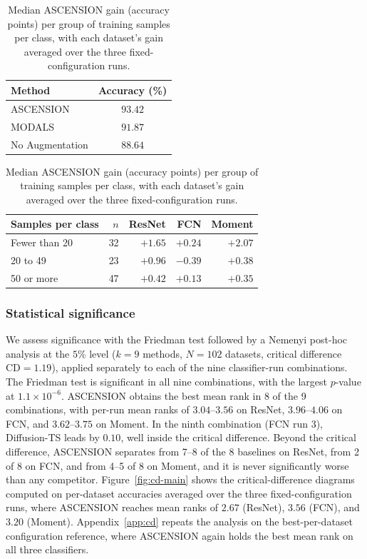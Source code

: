 \begin{table}[t]
\centering
\small
\begin{minipage}[t]{0.40\textwidth}
\centering
\caption{ASCENSION and MODALS performance on HAR dataset from
\citep{cheung2020modals}.}
\label{tab:modals}
\begin{tabular}{@{}lc@{}}
\toprule
\textbf{Method} & \textbf{Accuracy (\%)} \\
\midrule
ASCENSION & $\mathbf{93.42}$ \\
MODALS    & $91.87$ \\
No Augmentation    & $88.64$ \\
\bottomrule
\end{tabular}
\end{minipage}\hfill
\begin{minipage}[t]{0.56\textwidth}
\centering
\caption{Median ASCENSION gain (accuracy points) per group of
training samples per class, with each dataset's gain averaged over
the three fixed-configuration runs.}
\label{tab:gain-by-group}
\begin{tabular}{@{}lrrrr@{}}
\toprule
\textbf{Samples per class} & $n$ & \textbf{ResNet} & \textbf{FCN} & \textbf{Moment} \\
\midrule
Fewer than 20 & 32 & $+1.65$ & $+0.24$ & $+2.07$ \\
20 to 49      & 23 & $+0.96$ & $-0.39$ & $+0.38$ \\
50 or more    & 47 & $+0.42$ & $+0.13$ & $+0.35$ \\
\bottomrule
\end{tabular}
\end{minipage}
\end{table}

\subsubsection{Statistical significance}
\label{sec:results:significance}

We assess significance with the Friedman test followed by a Nemenyi
post-hoc analysis \citep{demsar2006statistical} at the $5\%$ level ($k = 9$ methods, $N = 102$
datasets, critical difference $\mathrm{CD} = 1.19$), applied
separately to each of the nine classifier-run combinations. The
Friedman test is significant in all nine combinations, with the
largest $p$-value at $1.1 \times 10^{-6}$. ASCENSION obtains the
best mean rank in 8 of the 9 combinations, with per-run mean ranks
of $3.04$--$3.56$ on ResNet, $3.96$--$4.06$ on FCN, and
$3.62$--$3.75$ on Moment. In the ninth combination (FCN run 3),
Diffusion-TS leads by $0.10$, well inside the critical difference.
Beyond the critical difference, ASCENSION separates from 7--8 of the
8 baselines on ResNet, from 2 of 8 on FCN, and from 4--5 of 8 on
Moment, and it is never significantly worse than any competitor.
Figure~\ref{fig:cd-main} shows the critical-difference diagrams
computed on per-dataset accuracies averaged over the three
fixed-configuration runs, where ASCENSION reaches mean ranks of
$2.67$ (ResNet), $3.56$ (FCN), and $3.20$ (Moment).
Appendix~\ref{app:cd} repeats the analysis on the best-per-dataset
configuration reference, where ASCENSION again holds the best mean
rank on all three classifiers.

